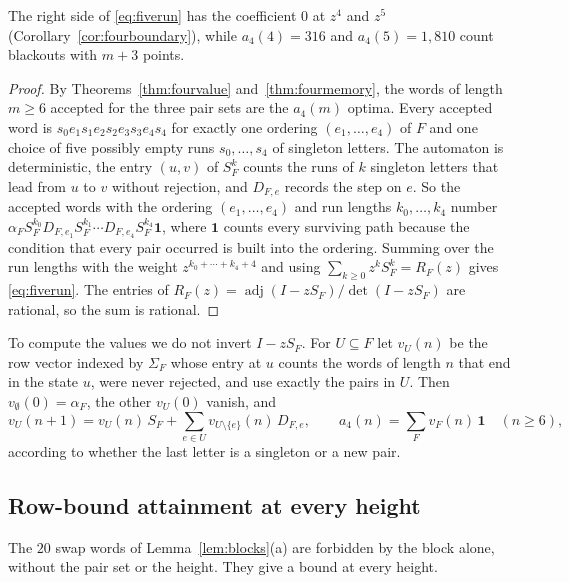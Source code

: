 The right side of \eqref{eq:fiverun} has the coefficient $0$ at $z^4$ and $z^5$ (Corollary~\ref{cor:fourboundary}), while $a_4(4)=316$ and $a_4(5)=1{,}810$ count blackouts with $m+3$ points.

\begin{proof}
By Theorems~\ref{thm:fourvalue} and~\ref{thm:fourmemory}, the words of length $m\ge6$ accepted for the three pair sets are the $a_4(m)$ optima. Every accepted word is $s_0e_1s_1e_2s_2e_3s_3e_4s_4$ for exactly one ordering $(e_1,\ldots,e_4)$ of $F$ and one choice of five possibly empty runs $s_0,\ldots,s_4$ of singleton letters. The automaton is deterministic, the entry $(u,v)$ of $S_F^k$ counts the runs of $k$ singleton letters that lead from $u$ to $v$ without rejection, and $D_{F,e}$ records the step on $e$. So the accepted words with the ordering $(e_1,\ldots,e_4)$ and run lengths $k_0,\ldots,k_4$ number $\alpha_FS_F^{k_0}D_{F,e_1}S_F^{k_1}\cdots D_{F,e_4}S_F^{k_4}\mathbf1$, where $\mathbf1$ counts every surviving path because the condition that every pair occurred is built into the ordering. Summing over the run lengths with the weight $z^{k_0+\cdots+k_4+4}$ and using $\sum_{k\ge0}z^kS_F^k=R_F(z)$ gives \eqref{eq:fiverun}. The entries of $R_F(z)=\operatorname{adj}(I-zS_F)/\det(I-zS_F)$ are rational, so the sum is rational.
\end{proof}

To compute the values we do not invert $I-zS_F$. For $U\subseteq F$ let $v_U(n)$ be the row vector indexed by $\Sigma_F$ whose entry at $u$ counts the words of length $n$ that end in the state $u$, were never rejected, and use exactly the pairs in $U$. Then $v_\emptyset(0)=\alpha_F$, the other $v_U(0)$ vanish, and
\begin{equation}\label{eq:fourrec}
v_U(n+1)=v_U(n)\,S_F+\sum_{e\in U}v_{U\setminus\{e\}}(n)\,D_{F,e},\qquad a_4(n)=\sum_F v_F(n)\,\mathbf1\quad(n\ge6),
\end{equation}
according to whether the last letter is a singleton or a new pair.

\subsection{Row-bound attainment at every height}

The $20$ swap words of Lemma~\ref{lem:blocks}(a) are forbidden by the block alone, without the pair set or the height. They give a bound at every height.

